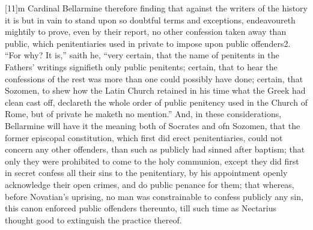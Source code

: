 [11]m Cardinal Bellarmine therefore finding that against the writers of the history it is but in vain to stand upon so doubtful terms and exceptions, endeavoureth mightily to prove, even by their report, no other confession taken away than public, which penitentiaries used in private to impose upon public offenders2. “For why? It is,” saith he, “very  certain, that the name of penitents in the Fathers’ writings signifieth only public penitents; certain, that to hear the confessions of the rest was more than one could possibly have done; certain, that Sozomen, to shew how the Latin Church retained in his time what the Greek had clean cast off, declareth the whole order of public penitency used in the Church of Rome, but of private he maketh no mention.” And, in these considerations, Bellarmine will have it the meaning both of Socrates and ofn Sozomen, that the former episcopal constitution, which first did erect penitentiaries, could not concern any other offenders, than such as publicly had sinned after baptism; that only they were prohibited to come to the holy communion, except they did first in secret confess all their sins to the penitentiary, by his appointment openly acknowledge their open crimes, and do public penance for them; that whereas, before Novatian’s uprising, no man was constrainable to confess publicly any sin, this canon enforced public offenders thereunto, till such time as Nectarius thought good to extinguish the practice thereof.

